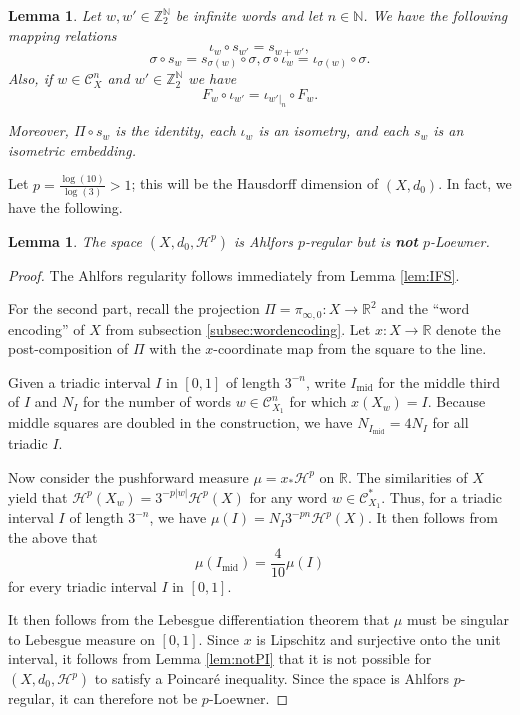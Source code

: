 \documentclass{amsart}
\theoremstyle{plain}
\newtheorem{lemma}[theorem]{Lemma}
\theoremstyle{definition}
\numberwithin{equation}{section}
\numberwithin{theorem}{section}
\newcommand{\HH}{\mathcal{H}}
\newcommand{\ZZ}{\mathbb{Z}}
\newcommand{\N}{\mathbb{N}}
\newcommand{\cC}{\mathcal{C}}
\newcommand{\R}{\mathbb{R}}
\begin{document}
\begin{lemma}\label{lem:relationships} Let $w,w'\in \ZZ_2^\N$ be infinite words and let $n\in \N$. We have the following mapping relations 
\[
\iota_w \circ s_{w'}=s_{w+w'},
\]
\[
\sigma \circ s_w = s_{\sigma(w)} \circ \sigma, \sigma \circ \iota_w = \iota_{\sigma(w)} \circ \sigma.
\]
Also, if $w\in \cC_X^n$ and $w'\in \ZZ_2^\N$ we have
\[
F_{w} \circ \iota_{w'} = \iota_{w'|_n} \circ F_{w}.
\]

Moreover, $\Pi \circ s_w$ is the identity, each $\iota_w$ is an isometry, and each $s_w$ is an isometric embedding.
\end{lemma}



Let $p = \frac{\log(10)}{\log(3)}>1$; this will be the Hausdorff dimension of $(X,d_0)$. In fact, we have the following.

\begin{lemma}\label{lem:notloewner}
The space $(X,d_0, \mathcal{H}^p)$ is Ahlfors $p$-regular but is \textbf{not} $p$-Loewner. 
\end{lemma}
\begin{proof} 
The Ahlfors regularity follows immediately from Lemma \ref{lem:IFS}.  

For the second part, recall the projection $\Pi=\pi_{\infty,0}:X\rightarrow \mathbb{R}^2$ and the ``word encoding'' of $X$ from subsection \ref{subsec:wordencoding}. Let $x:X \to \R$ denote the post-composition of $\Pi$ with the $x$-coordinate map from the square to the line. 

Given a triadic interval $I$ in $[0,1]$ of length $3^{-n}$, write $I_{\text{mid}}$ for the middle third of $I$ and $N_I$ for the number of words $w\in \cC_{X_1}^n$ for which $x(X_w)=I$. Because middle squares are doubled in the construction, we have $N_{I_{\text{mid}}}= 4 N_I$ for all triadic $I$.

Now consider the pushforward measure $\mu = x_{*}\mathcal{H}^p$ on $\R$. The similarities of $X$ yield that $\HH^p(X_w)=3^{-p|w|}\HH^p(X)$ for any word $w\in \cC_{X_1}^*$. Thus, for a triadic interval $I$ of length $3^{-n}$, we have $\mu(I) = N_I 3^{-pn} \HH^p(X)$. It then follows from the above that
$$ \mu(I_{\text{mid}}) = \frac{4}{10}\mu(I)$$
for every triadic interval $I$ in $[0,1]$.

It then follows from the Lebesgue differentiation theorem that $\mu$ must be singular to Lebesgue measure on $[0,1]$. Since $x$ is Lipschitz and surjective onto the unit interval, it follows from Lemma \ref{lem:notPI} that it is not possible for $(X,d_0,\mathcal{H}^p)$ to satisfy a Poincar\'e inequality. Since the space is Ahlfors $p$-regular, it can therefore not be $p$-Loewner.
\end{proof}
\end{document}
